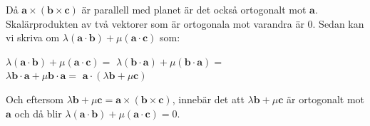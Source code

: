 Då $\bm{a}\times (\bm{b}\times \bm{c})$ är parallell med planet är det också ortogonalt mot $\bm{a}$.
Skalärprodukten av två vektorer som är ortogonala mot varandra är 0.
Sedan kan vi skriva om $\lambda(\bm{a}\cdot\bm{b}) + \mu(\bm{a}\cdot\bm{c})$ som:
\begin{center}
    $\lambda(\bm{a}\cdot\bm{b}) + \mu(\bm{a}\cdot\bm{c})=$
    $\lambda(\bm{b}\cdot\bm{a}) + \mu(\bm{b}\cdot\bm{a})=$\\
    $\lambda\bm{b}\cdot\bm{a} + \mu\bm{b}\cdot\bm{a}=$
    $\bm{a}\cdot(\lambda\bm{b} + \mu\bm{c})$
\end{center}
Och eftersom $\lambda\bm{b} + \mu\bm{c} = \bm{a}\times (\bm{b}\times \bm{c})$,
innebär det att $\lambda\bm{b} + \mu\bm{c}$ är ortogonalt mot $\bm{a}$ och då blir $\lambda(\bm{a}\cdot\bm{b}) + \mu(\bm{a}\cdot\bm{c}) = 0$.
